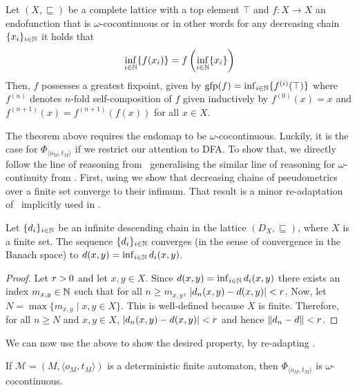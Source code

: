 \begin{theorem}\label{c2:thm:kleene}
	Let $(X, \sqsubseteq)$ be a complete lattice with a top element $\top$ and $f \colon X \to X$ an endofunction that is $\omega$-cocontinuous or in other words for any decreasing chain $\{x_i\}_{i \in \mathbb{N}}$ it holds that $$\inf_{i \in \mathbb{N}} \{f(x_i)\} = f \left( \inf_{i \in \mathbb{N}} \{ x_i \} \right)$$  
	Then, $f$ possesses a greatest fixpoint, given by 
	$\operatorname{gfp}(f) = \inf_{i \in \mathbb{N} }\{f^{(i)}(\top)\}$
	where $f^{(n)}$ denotes $n$-fold self-composition of $f$ given inductively by $f^{(0)}(x)=x$ and $f^{(n+1)}(x) = f^{(n+1)}(f(x))$ for all $x \in X$.
\end{theorem} 
The theorem above requires the endomap to be $\omega$-cocontinuous. Luckily, it is the case for $\Phi_{\langle o_M, t_M\rangle}$ if we restrict our attention to \textsf{DFA}. To show that, we directly follow the line of reasoning from~\cite[Lemma~5.6]{Bacci:2018:Bisimilarity} generalising the similar line of reasoning for $\omega$-continuity from \cite[Theorem~1]{Breugel:2012:On}. First, using   we show that decreasing chains of pseudometrics over a finite set converge to their infimum. That result is a minor re-adaptation of~\cite[Theorem~1]{Breugel:2012:On} implicitly used in \cite[Lemma~5.6]{Bacci:2018:Bisimilarity}.
\begin{lemma}\label{c2:lem:chain_conv_to_inf}
    Let $\{d_i\}_{i \in \mathbb{N}}$ be an infinite descending chain in the lattice $(D_X, \sqsubseteq)$, where $X$ is a finite set. The sequence $\{d_i\}_{i \in \mathbb{N}}$ converges (in the sense of convergence in the Banach space) to $d(x,y) = \inf_{i \in \mathbb{N}} d_i(x,y)$.
\end{lemma}
\begin{proof}
     Let $r > 0$ and let $x, y \in X$. Since $d(x,y) = \inf_{i \in \mathbb{N}} d_i(x,y)$ 
    there exists an index $m_{x,y} \in \mathbb{N}$ such that for all $n \geq m_{x,y}$, $|d_n(x,y) - d(x,y)| < r$. Now, let $N = \max \{m_{x,y} \mid x, y \in X\}$. This is well-defined because $X$ is finite. Therefore, for all $n \geq N$ and $x,y \in X$, $| d_n(x,y) - d(x,y)|< r$ and hence $\| d_n - d\| < r$.
\end{proof}
We can now use the above to show the desired property, by re-adapting \cite[Theorem~1]{Breugel:2012:On}. 
\begin{lemma}\label{c2:lem:cocontinuous} If $\mathcal{M} = (M, \langle o_M, t_M\rangle) $ is a deterministic finite automaton, then $\Phi_{\langle o_M, t_M\rangle}$ is $\omega$-cocontinuous.\end{lemma} 
